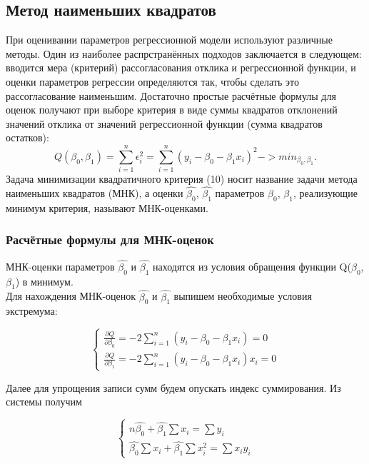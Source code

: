 \documentclass[a4]{article}
\begin{document}
						\subsection{Метод наименьших квадратов}
						При оценивании параметров регрессионной модели используют различные методы. Один из наиболее распрстранённых подходов заключается в следующем: вводится мера (критерий) рассогласования отклика и регрессионной функции, и оценки параметров регрессии определяются так, чтобы сделать это рассогласование наименьшим. Достаточно простые расчётные формулы для оценок получают при выборе критерия в виде суммы квадратов отклонений значений отклика от значений регрессионной функции (сумма квадратов остатков):
						$$Q(\beta_0, \beta_1) = \sum_{i = 1}^{n} \epsilon^2_i = \sum_{i = 1}^{n} (y_i - \beta_0 - \beta_1 x_i)^2 -> min_{\beta_0, \beta_1} .$$
						Задача минимизации квадратичного критерия (10) носит название задачи метода наименьших квадратов (МНК), а оценки $\hat{\beta_0}$, $\hat{\beta_1}$ параметров $\beta_0$, $\beta_1$, реализующие минимум критерия, называют МНК-оценками.
						\subsubsection{Расчётные формулы для МНК-оценок}
						МНК-оценки параметров $\hat{\beta_0}$ и $\hat{\beta_1}$ находятся из условия обращения функции Q($\beta_0$, $\beta_1$) в минимум.\\	
						Для нахождения МНК-оценок $\hat{\beta_0}$ и $\hat{\beta_1}$ выпишем необходимые условия экстремума:
						
						
						\begin{equation*} 
						\begin{cases}
						\frac{\partial Q}{\partial \beta_0} = -2 \sum_{i = 1}^{n} (y_i - \beta_0 - \beta_1 x_i) = 0\\
						\frac{\partial Q}{\partial \beta_1} = -2 \sum_{i = 1}^{n} (y_i - \beta_0 - \beta_1 x_i)x_i = 0
						\end{cases}
						\end{equation*}
						
						Далее для упрощения записи сумм будем опускать индекс суммирования. Из системы получим
						
						\begin{equation*} 
						\begin{cases}
						n\hat{\beta_0} + \hat{\beta_1} \sum x_i = \sum y_i\\
						\hat{\beta_0}\sum x_i + \hat{\beta_1} \sum x^2_i = \sum x_i y_i
						\end{cases}
						\end{equation*}
						
\end{document}
